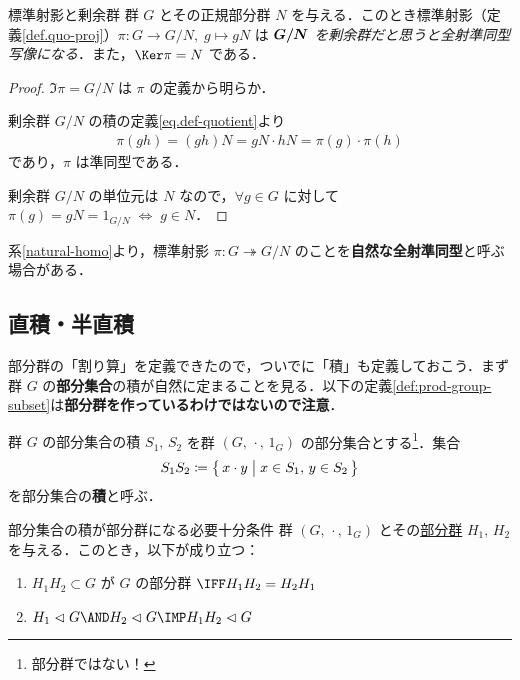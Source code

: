 \documentclass[geometry_main]{subfiles}
\begin{document}
\begin{mycol}[label=natural-homo]{標準射影と剰余群}
	群 $G$ とその正規部分群 $N$ を与える．このとき標準射影（定義\ref{def.quo-proj}）$\pi \colon G \to G/N,\; g \mapsto gN$ は\emph{ $\vb*{G/N}$ を剰余群だと思うと全射準同型写像になる}．また，$\Ker \pi = N$ である．
\end{mycol}

\begin{proof}
	$\Im \pi = G/N$ は $\pi$ の定義から明らか．
	
	剰余群 $G/N$ の積の定義\eqref{eq.def-quotient}より
	\begin{align}
		\pi(gh) = (gh)N = gN \cdot hN = \pi(g) \cdot \pi(h)
	\end{align}
	であり，$\pi$ は準同型である．

	剰余群 $G/N$ の単位元は $N$ なので，$\forall g \in G$ に対して $\pi(g) = gN = 1_{G/N} \; \Longleftrightarrow \; g \in N$． 
\end{proof}

\begin{marker}
	系\ref{natural-homo}より，標準射影 $\pi \colon G \twoheadrightarrow G/N$ のことを\textbf{自然な全射準同型}と呼ぶ場合がある．
\end{marker}

\subsection{直積・半直積}

部分群の「割り算」を定義できたので，ついでに「積」も定義しておこう．まず群 $G$ の\textbf{部分集合}の積が自然に定まることを見る．以下の定義\ref{def:prod-group-subset}は\textbf{部分群を作っているわけではないので注意}．
\begin{mydef}[label=def:prod-group-subset]{群 $G$ の部分集合の積}
	$S_1,\, S_2$ を群 $(G,\, \cdot \mathrel{},\, 1_G)$ の部分集合とする\footnote{部分群ではない！}．集合
	\begin{align}
		S_1 S_2 \coloneqq \bigl\{\, x \cdot y \bigm| x \in S_1,\, y \in S_2 \,\bigr\} 
	\end{align}
	を部分集合の\textbf{積}と呼ぶ．
\end{mydef}

\begin{myprop}[label=prop:prod-group]{部分集合の積が部分群になる必要十分条件}
	群 $(G,\, \cdot \mathrel{},\, 1_G)$ とその\underline{部分群} $H_1,\, H_2$ を与える．このとき，以下が成り立つ：
	\begin{enumerate}
		\item $H_1H_2 \subset G$ が $G$ の部分群 $\IFF H_1H_2 = H_2 H_1$ 
		\item $H_1 \vartriangleleft G \AND H_2 \vartriangleleft G \IMP H_1H_2 \vartriangleleft G$
	\end{enumerate}
\end{myprop}
\end{document}
